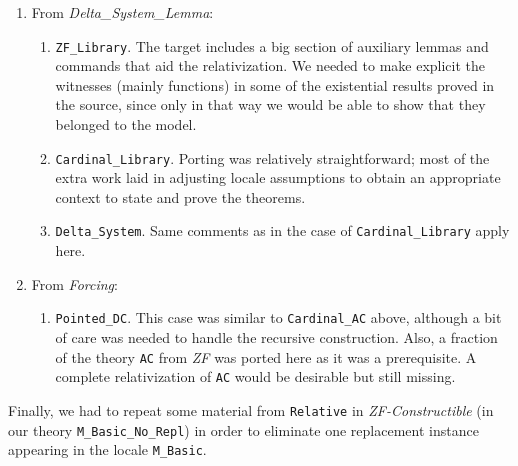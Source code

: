 \documentclass[11pt,a4paper,english]{article}
\newcommand{\session}[1]{\textit{#1}}
\newcommand{\theory}[1]{\texttt{#1}}
\begin{document}
\begin{enumerate}
\begin{enumerate}
  \end{enumerate}
\item From \session{Delta\_System\_Lemma}:
  \begin{enumerate}
  \item \theory{ZF\_Library}. The target includes a big section of
    auxiliary lemmas and commands that aid the relativization. We
    needed to make explicit the witnesses (mainly functions) in some of the
    existential results proved in the source, since only in that way
    we would be able to show that they belonged to the model.
  \item \theory{Cardinal\_Library}. Porting was relatively
    straightforward; most of the extra work laid in adjusting locale
    assumptions to obtain an appropriate context to state and prove
    the theorems.
  \item \theory{Delta\_System}. Same comments as in the case of
    \theory{Cardinal\_Library} apply here.
  \end{enumerate}
\item From \session{Forcing}:
  \begin{enumerate}
  \item \theory{Pointed\_DC}. This case was similar to
    \theory{Cardinal\_AC} above, although a bit of care was needed to
    handle the recursive construction. Also, a fraction of the theory
    \theory{AC} from \session{ZF} was ported here as it was a
    prerequisite. A complete relativization of \theory{AC} would be
    desirable but still missing.
  \end{enumerate}
\end{enumerate}

Finally, we had to repeat some material from \theory{Relative} in
\session{ZF-Constructible} (in our theory \theory{M\_Basic\_No\_Repl})
in order to eliminate one replacement instance appearing in the locale
\texttt{M\_Basic}.






\end{document}
